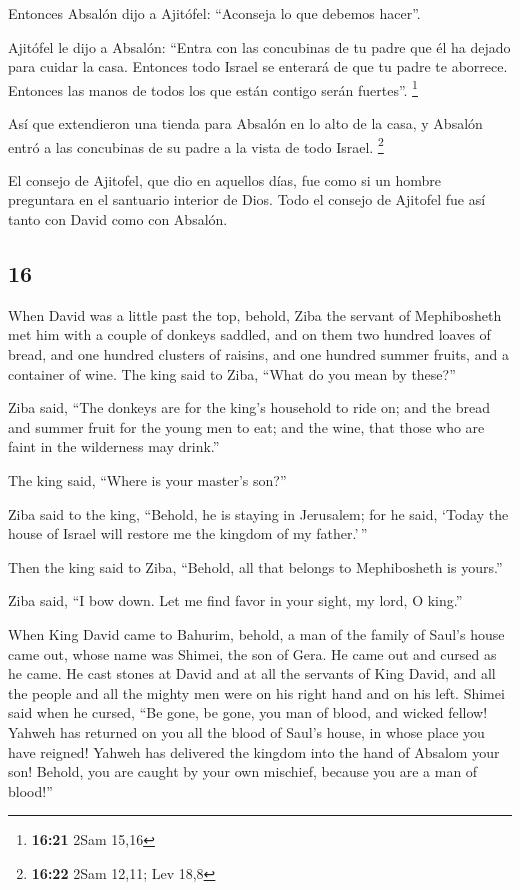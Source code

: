 \begin{paracol}{2}
 Entonces Absalón dijo a Ajitófel: ``Aconseja lo que
debemos hacer''.

 Ajitófel le dijo a Absalón: ``Entra con las concubinas
de tu padre que él ha dejado para cuidar la casa. Entonces todo Israel
se enterará de que tu padre te aborrece. Entonces las manos de todos los
que están contigo serán fuertes''. \footnote{\textbf{16:21} 2Sam 15,16}

 Así que extendieron una tienda para Absalón en lo alto
de la casa, y Absalón entró a las concubinas de su padre a la vista de
todo Israel. \footnote{\textbf{16:22} 2Sam 12,11; Lev 18,8}

 El consejo de Ajitofel, que dio en aquellos días, fue
como si un hombre preguntara en el santuario interior de Dios. Todo el
consejo de Ajitofel fue así tanto con David como con Absalón.

\switchcolumn
\begin{otherlanguage}{english}

\hypertarget{section-31}{%
\section{16}\label{section-31}}

 When David was a little past the top, behold, Ziba the
servant of Mephibosheth met him with a couple of donkeys saddled, and on
them two hundred loaves of bread, and one hundred clusters of raisins,
and one hundred summer fruits, and a container of wine. 
The king said to Ziba, ``What do you mean by these?''

Ziba said, ``The donkeys are for the king's household to ride on; and
the bread and summer fruit for the young men to eat; and the wine, that
those who are faint in the wilderness may drink.''

 The king said, ``Where is your master's son?''

Ziba said to the king, ``Behold, he is staying in Jerusalem; for he
said, `Today the house of Israel will restore me the kingdom of my
father.'\,''

 Then the king said to Ziba, ``Behold, all that belongs to
Mephibosheth is yours.''

Ziba said, ``I bow down. Let me find favor in your sight, my lord, O
king.''

 When King David came to Bahurim, behold, a man of the
family of Saul's house came out, whose name was Shimei, the son of Gera.
He came out and cursed as he came.  He cast stones at
David and at all the servants of King David, and all the people and all
the mighty men were on his right hand and on his left. 
Shimei said when he cursed, ``Be gone, be gone, you man of blood, and
wicked fellow!  Yahweh has returned on you all the blood
of Saul's house, in whose place you have reigned! Yahweh has delivered
the kingdom into the hand of Absalom your son! Behold, you are caught by
your own mischief, because you are a man of blood!''


\end{otherlanguage}
\end{paracol}
